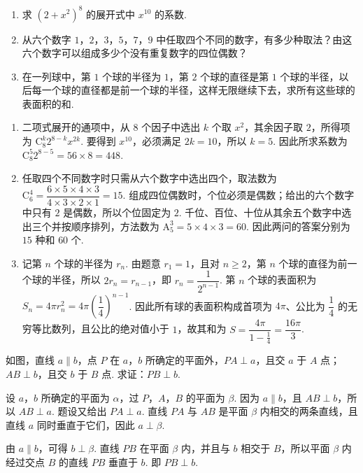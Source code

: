 \documentclass[UTF8,a4paper,oneside,11pt]{ctexbook}
\begin{document}
\begin{problem}

\begin{enumerate}
\item 求 \(\left(2+x^2\right)^8\) 的展开式中 \(x^{10}\) 的系数.

\item 从六个数字 \(1\)，\(2\)，\(3\)，\(5\)，\(7\)，\(9\) 中任取四个不同的数字，有多少种取法？由这六个数字可以组成多少个没有重复数字的四位偶数？

\item 在一列球中，第 \(1\) 个球的半径为 \(1\)，第 \(2\) 个球的直径是第 \(1\) 个球的半径，以后每一个球的直径都是前一个球的半径，这样无限继续下去，求所有这些球的表面积的和.
\end{enumerate}

\begin{solution}
\begin{enumerate}
\item 二项式展开的通项中，从 \(8\) 个因子中选出 \(k\) 个取 \(x^2\)，其余因子取 \(2\)，所得项为 \(\mathrm C_8^k2^{8-k}x^{2k}\). 要得到 \(x^{10}\)，必须满足 \(2k=10\)，所以 \(k=5\). 因此所求系数为 \(\mathrm C_8^5 2^{8-5}=56\times8=448\).
\item 任取四个不同数字时只需从六个数字中选出四个，取法数为 \(\mathrm C_6^4=\dfrac{6\times5\times4\times3}{4\times3\times2\times1}=15\). 组成四位偶数时，个位必须是偶数；给出的六个数字中只有 \(2\) 是偶数，所以个位固定为 \(2\). 千位、百位、十位从其余五个数字中选出三个并按顺序排列，方法数为 \(\mathrm A_5^3=5\times4\times3=60\). 因此两问的答案分别为 \(15\) 种和 \(60\) 个.
\item 记第 \(n\) 个球的半径为 \(r_n\). 由题意 \(r_1=1\)，且对 \(n\geqslant2\)，第 \(n\) 个球的直径为前一个球的半径，所以 \(2r_n=r_{n-1}\)，即 \(r_n=\dfrac{1}{2^{n-1}}\). 第 \(n\) 个球的表面积为 \(S_n=4\pi r_n^2=4\pi\left(\dfrac14\right)^{n-1}\). 因此所有球的表面积构成首项为 \(4\pi\)、公比为 \(\dfrac14\) 的无穷等比数列，且公比的绝对值小于 \(1\)，故其和为 \(S=\dfrac{4\pi}{1-\frac14}=\dfrac{16\pi}{3}\).
\end{enumerate}
\end{solution}
\end{problem}

\begin{problem}

如图，直线 \(a\parallel b\)，点 \(P\) 在 \(a\)，\(b\) 所确定的平面外，\(PA\perp a\)，且交 \(a\) 于 \(A\) 点；\(AB\perp b\)，且交 \(b\) 于 \(B\) 点. 求证：\(PB\perp b\).

\begin{solution}
设 \(a\)，\(b\) 所确定的平面为 \(\alpha\)，过 \(P\)，\(A\)，\(B\) 的平面为 \(\beta\). 因为 \(a\parallel b\)，且 \(AB\perp b\)，所以 \(AB\perp a\). 题设又给出 \(PA\perp a\). 直线 \(PA\) 与 \(AB\) 是平面 \(\beta\) 内相交的两条直线，且直线 \(a\) 同时垂直于它们，因此 \(a\perp\beta\).

由 \(a\parallel b\)，可得 \(b\perp\beta\). 直线 \(PB\) 在平面 \(\beta\) 内，并且与 \(b\) 相交于 \(B\)，所以平面 \(\beta\) 内经过交点 \(B\) 的直线 \(PB\) 垂直于 \(b\). 即 \(PB\perp b\).
\end{solution}
\end{problem}
\end{document}
